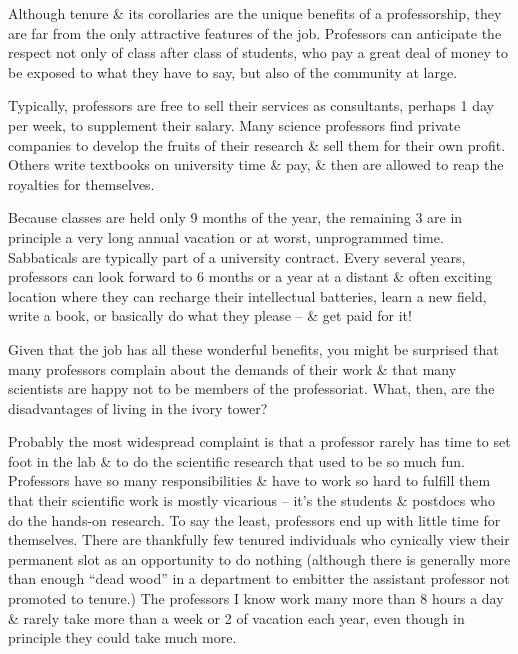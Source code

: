 \documentclass{article}
\begin{document}
\begin{enumerate}
\begin{itemize}
\begin{itemize}
			Although tenure \& its corollaries are the unique benefits of a professorship, they are far from the only attractive features of the job. Professors can anticipate the respect not only of class after class of students, who pay a great deal of money to be exposed to what they have to say, but also of the community at large.

			Typically, professors are free to sell their services as consultants, perhaps 1 day per week, to supplement their salary. Many science professors find private companies to develop the fruits of their research \& sell them for their own profit. Others write textbooks on university time \& pay, \& then are allowed to reap the royalties for themselves.

			Because classes are held only 9 months of the year, the remaining 3 are in principle a very long annual vacation or at worst, unprogrammed time. Sabbaticals are typically part of a university contract. Every several years, professors can look forward to 6 months or a year at a distant \& often exciting location where they can recharge their intellectual batteries, learn a new field, write a book, or basically do what they please -- \& get paid for it!

			Given that the job has all these wonderful benefits, you might be surprised that many professors complain about the demands of their work \& that many scientists are happy not to be members of the professoriat. What, then, are the disadvantages of living in the ivory tower?

			Probably the most widespread complaint is that a professor rarely has time to set foot in the lab \& to do the scientific research that used to be so much fun. Professors have so many responsibilities \& have to work so hard to fulfill them that their scientific work is mostly vicarious -- it's the students \& postdocs who do the hands-on research. To say the least, professors end up with little time for themselves. There are thankfully few tenured individuals who cynically view their permanent slot as an opportunity to do nothing (although there is generally more than enough ``dead wood'' in a department to embitter the assistant professor not promoted to tenure.) The professors I know work many more than 8 hours a day \& rarely take more than a week or 2 of vacation each year, even though in principle they could take much more.


\end{itemize}
\end{itemize}
\end{enumerate}
\end{document}

